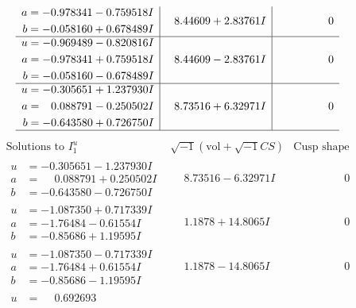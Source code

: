 \documentclass[1p]{elsarticle_modified}
\theoremstyle{definition}
\newcommand{\I}{\sqrt{-1}}
\begin{document}
$$\begin{array}{c|c|c}
\begin{aligned}
a &= -0.978341 - 0.759518 I \\
b &= -0.058160 + 0.678489 I\end{aligned}
 & \phantom{-}8.44609 + 2.83761 I & \phantom{-0.000000 } 0 \\ \hline\begin{aligned}
u &= -0.969489 - 0.820816 I \\
a &= -0.978341 + 0.759518 I \\
b &= -0.058160 - 0.678489 I\end{aligned}
 & \phantom{-}8.44609 - 2.83761 I & \phantom{-0.000000 } 0 \\ \hline\begin{aligned}
u &= -0.305651 + 1.237930 I \\
a &= \phantom{-}0.088791 - 0.250502 I \\
b &= -0.643580 + 0.726750 I\end{aligned}
 & \phantom{-}8.73516 + 6.32971 I & \phantom{-0.000000 } 0\\
 \hline 
 \end{array}$$\newpage$$\begin{array}{c|c|c}  
\text{Solutions to }I^u_{1}& \I (\text{vol} + \sqrt{-1}CS) & \text{Cusp shape}\\
 \hline 
\begin{aligned}
u &= -0.305651 - 1.237930 I \\
a &= \phantom{-}0.088791 + 0.250502 I \\
b &= -0.643580 - 0.726750 I\end{aligned}
 & \phantom{-}8.73516 - 6.32971 I & \phantom{-0.000000 } 0 \\ \hline\begin{aligned}
u &= -1.087350 + 0.717339 I \\
a &= -1.76484 - 0.61554 I \\
b &= -0.85686 + 1.19595 I\end{aligned}
 & \phantom{-}1.1878 + 14.8065 I & \phantom{-0.000000 } 0 \\ \hline\begin{aligned}
u &= -1.087350 - 0.717339 I \\
a &= -1.76484 + 0.61554 I \\
b &= -0.85686 - 1.19595 I\end{aligned}
 & \phantom{-}1.1878 - 14.8065 I & \phantom{-0.000000 } 0 \\ \hline\begin{aligned}
u &= \phantom{-}0.692693\phantom{ +0.000000I} \\

\end{aligned}
\end{array}$$
\end{document}

